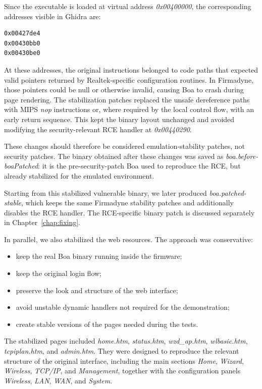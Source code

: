   Since the executable is loaded at virtual address \emph{0x00400000}, the corresponding addresses visible in Ghidra are:

\begin{lstlisting}[language=bash]
0x00427de4
0x00430bb0
0x00430be0
\end{lstlisting}

  At these addresses, the original instructions belonged to code paths that expected valid pointers returned by Realtek-specific configuration routines. In Firmadyne, those pointers could be null or otherwise invalid,
  causing Boa to crash during page rendering. The stabilization patches replaced the unsafe dereference paths with MIPS \emph{nop} instructions or, where required by the local control flow, with an early return
  sequence. This kept the binary layout unchanged and avoided modifying the security-relevant RCE handler at \emph{0x00440290}.

  These changes should therefore be considered emulation-stability patches, not security patches. The binary obtained after these changes was saved as \emph{boa.before-boaPatched}: it is the pre-security-patch Boa used
  to reproduce the RCE, but already stabilized for the emulated environment.

  Starting from this stabilized vulnerable binary, we later produced \emph{boa.patched-stable}, which keeps the same Firmadyne stability patches and additionally disables the RCE handler. The RCE-specific binary patch
  is discussed separately in Chapter~\ref{chap:fixing}.

              In parallel, we also stabilized the web resources. The approach was conservative:
              \begin{itemize}
                  \item keep the real Boa binary running inside the firmware;
                  \item keep the original login flow;
                  \item preserve the look and structure of the web interface;
                  \item avoid unstable dynamic handlers not required for the demonstration;
                  \item create stable versions of the pages needed during the tests.
              \end{itemize}

              The stabilized pages included \emph{home.htm}, \emph{status.htm}, \emph{wzd\_ap.htm}, \emph{wlbasic.htm}, \emph{tcpiplan.htm}, and \emph{admin.htm}. They were designed to reproduce the relevant
              structure of the original interface, including the main sections \emph{Home}, \emph{Wizard}, \emph{Wireless}, \emph{TCP/IP}, and \emph{Management}, together with the configuration panels
              \emph{Wireless}, \emph{LAN}, \emph{WAN}, and \emph{System}.

